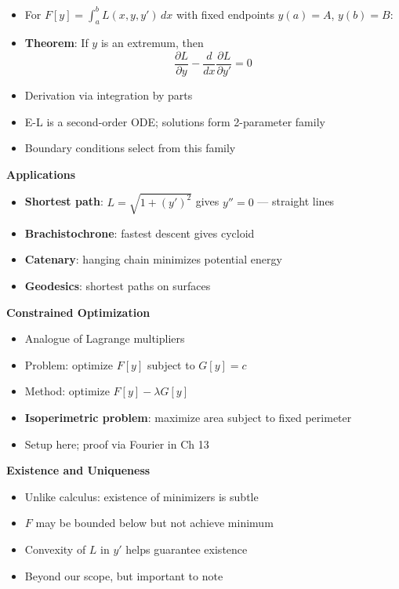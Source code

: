 \documentclass[
  10pt,
  letterpaper,
]{scrbook}
\providecommand{\tightlist}{%
  \setlength{\itemsep}{0pt}\setlength{\parskip}{0pt}}
\begin{document}
\begin{itemize}
\tightlist
\item
  For \(F[y] = \int_a^b L(x, y, y')\, dx\) with fixed endpoints
  \(y(a) = A\), \(y(b) = B\):
\item
  \textbf{Theorem}: If \(y\) is an extremum, then
  \[\frac{\partial L}{\partial y} - \frac{d}{dx}\frac{\partial L}{\partial y'} = 0\]
\item
  Derivation via integration by parts
\item
  E-L is a second-order ODE; solutions form 2-parameter family
\item
  Boundary conditions select from this family
\end{itemize}

\textbf{Applications}

\begin{itemize}
\tightlist
\item
  \textbf{Shortest path}: \(L = \sqrt{1 + (y')^2}\) gives \(y'' = 0\)
  --- straight lines
\item
  \textbf{Brachistochrone}: fastest descent gives cycloid
\item
  \textbf{Catenary}: hanging chain minimizes potential energy
\item
  \textbf{Geodesics}: shortest paths on surfaces
\end{itemize}

\textbf{Constrained Optimization}

\begin{itemize}
\tightlist
\item
  Analogue of Lagrange multipliers
\item
  Problem: optimize \(F[y]\) subject to \(G[y] = c\)
\item
  Method: optimize \(F[y] - \lambda G[y]\)
\item
  \textbf{Isoperimetric problem}: maximize area subject to fixed
  perimeter
\item
  Setup here; proof via Fourier in Ch 13
\end{itemize}

\textbf{Existence and Uniqueness}

\begin{itemize}
\tightlist
\item
  Unlike calculus: existence of minimizers is subtle
\item
  \(F\) may be bounded below but not achieve minimum
\item
  Convexity of \(L\) in \(y'\) helps guarantee existence
\item
  Beyond our scope, but important to note
\end{itemize}
\end{document}
